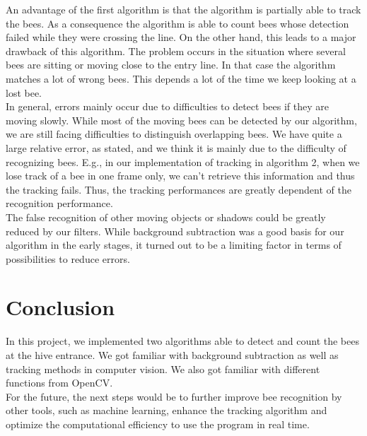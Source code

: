 \documentclass[10pt,twocolumn,letterpaper]{article}
\begin{document}
An advantage of the first algorithm is that the algorithm is partially able to track the bees. As a consequence the algorithm is able to count bees whose detection failed while they were crossing the line. On the other hand, this leads to a major drawback of this algorithm. The problem occurs in the situation where several bees are sitting or moving close to the entry line. In that case the algorithm matches a lot of wrong bees. This depends a lot of the time we keep looking at a lost bee.\\
In general, errors mainly occur due to difficulties to detect bees if they are moving slowly. While most of the moving bees can be detected by our algorithm, we are still facing difficulties to distinguish overlapping bees. We have quite a large relative error, as stated, and we think it is mainly due to the difficulty of recognizing bees. E.g., in our implementation of tracking in algorithm 2, when we lose track of a bee in one frame only, we can’t retrieve this information and thus the tracking fails. Thus, the tracking performances are greatly dependent of the recognition performance. \\
The false recognition of other moving objects or shadows could be greatly reduced by our filters. While background subtraction was a good basis for our algorithm in the early stages, it turned out to be a limiting factor in terms of possibilities to reduce errors.

\section{Conclusion}

In this project, we implemented two algorithms able to detect and count the bees at the hive entrance. We got familiar with background subtraction as well as tracking methods in computer vision. We also got familiar with different functions from OpenCV.\\
For the future, the next steps would be to further improve bee recognition by other tools, such as machine learning, enhance the tracking algorithm and optimize the computational efficiency to use the program in real time.



{\small


}
\end{document}
